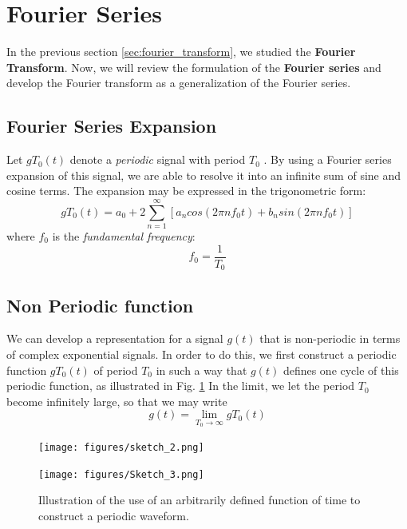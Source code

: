 \documentclass{article}
\begin{document}
\section{Fourier Series}
In the previous section \ref{sec:fourier_transform}, we studied the \textbf{Fourier Transform}. Now, we will review the formulation of the \textbf{Fourier series} and develop the Fourier
transform as a generalization of the Fourier series.

\subsection{Fourier Series Expansion}
Let $gT_0(t)$ denote a \textit{periodic} signal with period $T_0$ . By using a Fourier series expansion of
this signal, we are able to resolve it into an infinite sum of sine and cosine terms.
The expansion may be expressed in the trigonometric form:
\begin{equation}
    gT_0(t) = a_0 + 2 \sum_{n=1}^{\infty} [ a_n cos(2\pi n f_0 t) + b_n sin(2\pi n f_0 t)]
\end{equation}
where $ f_0$ is the \textit{fundamental frequency}:
\begin{equation}
    f_0 = \frac{1}{T_0}
\end{equation}

\subsection{Non Periodic function}
We can develop a  representation for a signal $g(t)$   that is non-periodic in terms of complex exponential signals.
In order to do this, we first construct a periodic function $ gT_0(t)$ of period $ T_0 $ in such a way
that $g(t)$ defines one cycle of this periodic function, as illustrated in Fig. \ref{fig:figu}
In the limit, we let the period $T_0 $ become infinitely large, so that we may
write
\begin{equation}
    g(t) =  \lim_{T_0\to\infty} gT_0(t)
\end{equation}

\begin{figure}[h!]

\texttt{[image: figures/sketch\_2.png]}
\label{fig:f2}

\texttt{[image: figures/Sketch\_3.png]}
\label{fig:f3}

\caption{Illustration of the use of an arbitrarily defined function of time to construct
a periodic waveform.}
\label{fig:figu}

\end{figure}
\newpage
\end{document}
